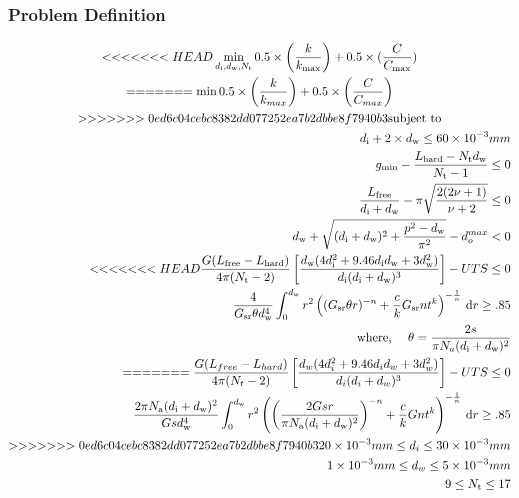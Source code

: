 \documentclass[10pt]{article}
\begin{document}
	\subsubsection{Problem Definition}
	\vspace{-.2in}
	\begin{equation}
					\begin{gathered}
<<<<<<< HEAD
	 					\min_{d_{\text{i}}, d_{\text{w}}, N_{\text{t}}} 0.5 \times\left(\frac{k}{k_{\text{max}}}\right) + 0.5 \times (\frac{C}{C_{\text{max}}}) \\
=======
	 					\min_{} 0.5 \times\left(\frac{k}{k_{max}}\right) + 0.5 \times \left( \frac{C}{C_{max}}\right) \\
>>>>>>> 0ed6c04cebc8382dd077252ea7b2dbbe8f7940b3
	 					\mbox{subject to} \\%
						\begin{split}
							 d_{\text{i}} + 2 \times d_{\text{w}} \leq 60 \times 10^{-3} mm\\
							 g_{\text{min}} - \dfrac{L_{\text{hard}} - N_{\text{t}}d_{\text{w}}}{N_{\text{t}}-1} \leq 0\\
							 \frac{L_{\text{free}}}{d_{\text{i}} + d_{\text{w}}} - \pi \sqrt{\frac{2(2 \nu + 1)}{\nu + 2}} \leq 0\\
							 d_{\text{w}} + \sqrt{(d_{\text{i}} + d_{\text{w}})^{2} + \frac{p^{2} - d_{\text{w}}}{\pi^{2}}} - d_{o}^{max} < 0\\
<<<<<<< HEAD
							 \frac{G(L_{\text{free}} - L_{\text{hard}})}{4 \pi (N_{\text{t}} - 2) } \left[\frac{d_{\text{w}} (4d_{\text{i}}^{2} + 9.46d_{\text{i}} d_{\text{w}} + 3 d_{\text{w}}^{2})}{d_{\text{i}}(d_{\text{i}}+d_{\text{w}})^{3}}\right] - UTS \leq 0\\
							 \frac{4}{G_{\text{sr}}\theta d_{\text{w}}^{4}}\int_0^{d_{\text{w}}} r^2 \left( (G_{\text{sr}}\theta r)^{-n} + \frac{c}{k} G_{\text{sr}}nt^k \right)^{-\frac{1}{n}} \,\mathrm{d} r \ge .85\\
							 \mbox{where, } \quad
							  \theta = {2s\over \pi N_a (d_{\text{i}}+d_{\text{w}})^2}\\
=======
							 \frac{G(L_{free} - L_{hard})}{4 \pi (N_{t} - 2) } \left[\frac{d_{w} (4d_{i}^{2} + 9.46d_{i} d_{w} + 3 d_{w}^{2})}{d_{i}(d_{i}+d_{w})^{3}}\right] - UTS \leq 0\\
							 \frac{2\pi N_{\text{a}} (d_{\text{i}}+d_{\text{w}})^2}{Gsd_{\text{w}}^4}\int_0^{d_\text{w}} r^2 \left(\left(\frac{2Gsr}{\pi N_{\text{a}} (d_{\text{i}}+d_{\text{w}})^2}\right)^{-n} + {c\over k} Gnt^k \right)^{-{1\over n}} \,\mathrm{d} r\geq .85\\
>>>>>>> 0ed6c04cebc8382dd077252ea7b2dbbe8f7940b3
							 20 \times 10 ^{-3} mm \leq d_{i} \leq 30 \times 10^{-3} mm\\	 
							 1 \times 10^{-3} mm \leq d_{w} \leq 5 \times 10^{-3} mm\\	 
							 9 \leq N_{\text{t}} \leq 17\\	 
						\end{split}
					\end{gathered}
					\label{eq:Case_2_Problem_Definition}	
				\end{equation}
\end{document}
